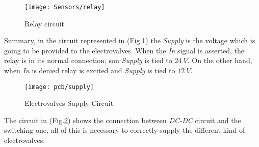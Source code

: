 \begin{figure}[h]
	\begin{center}
		\texttt{[image: Sensors/relay]}
		\caption{Relay circuit}
		\label{Fig:relay}
	\end{center}
\end{figure}

Summary, in the circuit represented  in (Fig.\ref{Fig:relay}) the \textit{Supply} is the voltage which is going to be provided to the electrovalves. When the \textit{In} signal is asserted, the relay is in its normal connection, son \textit{Supply} is tied to $24\ V$. On the other hand, when \textit{In} is denied relay is excited and \textit{Supply} is tied to $12\ V$.
\newpage

\begin{figure}[t]
	\centering
	\texttt{[image: pcb/supply]}
	\caption{Electrovalves Supply Circuit}
	\label{Fig:supply}
\end{figure}

The circuit in (Fig.\ref{Fig:supply}) shows the connection between \textit{DC-DC} circuit and the switching one, all of this is necessary to correctly supply the different kind of electrovalves.

